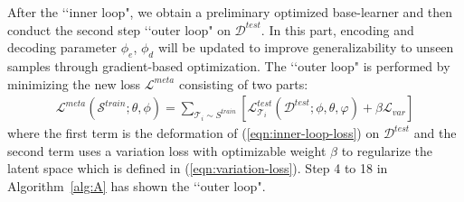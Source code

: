 \documentclass[10pt,conference,a4paper]{IEEEtran}
\begin{document}
After the ‘‘inner loop", we obtain a preliminary optimized base-learner and then conduct the second step ‘‘outer loop" on $\mathcal{D}^{test}$. In this part, encoding and decoding parameter $\phi_{e}$, $\phi_{d}$ will be updated to improve generalizability to unseen samples through gradient-based optimization. The ‘‘outer loop" is performed by minimizing the new loss $\mathcal{L}^{meta}$ consisting of two parts: 
\begin{equation}
\begin{split}
\mathcal{L}^{meta} (\mathcal{S}^{train}; \theta, \phi)\! = \!\!\sum_{\mathcal{T}_{i}\sim S^{train}}\![\mathcal{L}_{\mathcal{T}_{i}}^{test} (\mathcal{D}^{test}; \phi, \theta, \varphi)\! + \!\beta \mathcal {L}_{var}]
\end{split}
\end{equation}
where the first term is the deformation of (\ref{eqn:inner-loop-loss}) on $\mathcal{D}^{test}$ and the second term uses a variation loss with optimizable weight $\beta$ to regularize the latent space which is defined in (\ref{eqn:variation-loss}). Step 4 to 18 in Algorithm~\ref{alg:A} has shown the ‘‘outer loop".
\end{document}
